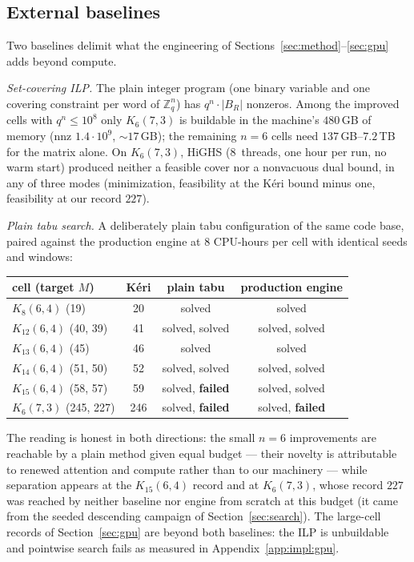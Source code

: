 \documentclass[11pt]{amsart}
\newcommand{\Kq}[3]{K_{#1}(#2,#3)}
\newcommand{\Zq}{\mathbb{Z}_q}
\begin{document}
\subsection{External baselines}\label{app:impl:baseline}

Two baselines delimit what the engineering of
Sections~\ref{sec:method}--\ref{sec:gpu} adds beyond compute.

\emph{Set-covering ILP.} The plain integer program (one binary variable
and one covering constraint per word of $\Zq^n$) has
$q^n\cdot|B_R|$ nonzeros. Among the improved cells with $q^n\le 10^8$
only $\Kq{6}{7}{3}$ is buildable in the machine's $480$\,GB of memory
(nnz $1.4\cdot 10^9$, ${\sim}17$\,GB); the remaining $n=6$ cells need
$137$\,GB--$7.2$\,TB for the matrix alone. On $\Kq{6}{7}{3}$, HiGHS
(8~threads, one hour per run, no warm start) produced neither a feasible
cover nor a nonvacuous dual bound, in any of three modes (minimization,
feasibility at the K\'eri bound minus one, feasibility at our record
$227$).

\emph{Plain tabu search.} A deliberately plain tabu configuration of the
same code base, paired against the production engine at $8$ CPU-hours per
cell with identical seeds and windows:

\begin{center}
\begin{tabular}{lccc}
\toprule
cell (target $M$) & K\'eri & plain tabu & production engine \\
\midrule
$\Kq{8}{6}{4}$ (19) & 20 & solved & solved \\
$\Kq{12}{6}{4}$ (40, 39) & 41 & solved, solved & solved, solved \\
$\Kq{13}{6}{4}$ (45) & 46 & solved & solved \\
$\Kq{14}{6}{4}$ (51, 50) & 52 & solved, solved & solved, solved \\
$\Kq{15}{6}{4}$ (58, 57) & 59 & solved, \textbf{failed} & solved, solved \\
$\Kq{6}{7}{3}$ (245, 227) & 246 & solved, \textbf{failed} & solved, \textbf{failed} \\
\bottomrule
\end{tabular}
\end{center}

The reading is honest in both directions: the small $n=6$ improvements
are reachable by a plain method given equal budget --- their novelty is
attributable to renewed attention and compute rather than to our
machinery --- while separation appears at the $\Kq{15}{6}{4}$ record and
at $\Kq{6}{7}{3}$, whose record $227$ was reached by neither baseline nor
engine from scratch at this budget (it came from the seeded descending
campaign of Section~\ref{sec:search}). The large-cell records of
Section~\ref{sec:gpu} are beyond both baselines: the ILP is unbuildable
and pointwise search fails as measured in
Appendix~\ref{app:impl:gpu}.
\end{document}
